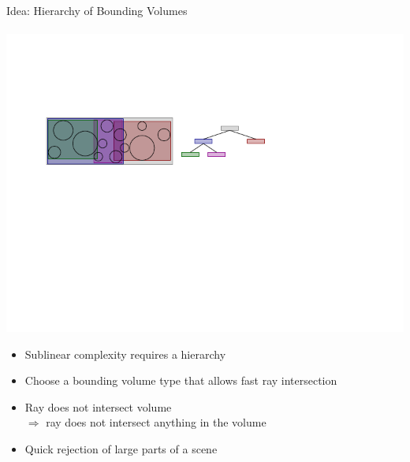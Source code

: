 \documentclass[utf8,stillsansserifmath,fleqn,t]{beamer}
\begin{document}
\begin{frame}[label=acceleration-3]
\frametitle{\insertsection}
Idea: Hierarchy of Bounding Volumes\\~\\
\includegraphics[width=\textwidth]{./fig/bvh.pdf}
\begin{itemize}
\item Sublinear complexity requires a hierarchy
\item Choose a bounding volume type that allows fast ray intersection
\item Ray does not intersect volume\\
    $\Rightarrow$ ray does not intersect anything in the volume
\item Quick rejection of large parts of a scene
\end{itemize}
\end{frame}
\end{document}
